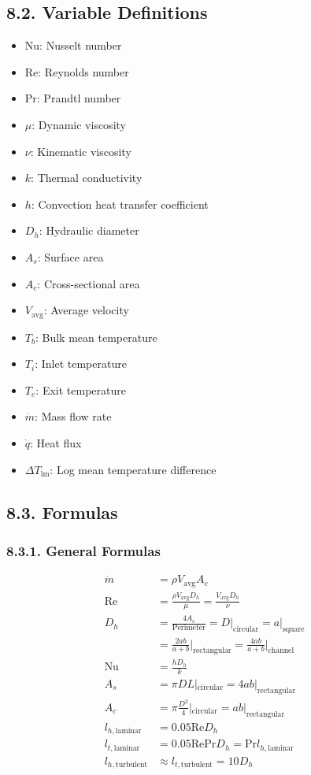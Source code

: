 \begin{multicols*}{2}
\subsection*{8.2. Variable Definitions}
\begin{itemize}
    \item Nu: Nusselt number
    \item Re: Reynolds number
    \item Pr: Prandtl number
    \item $\mu$: Dynamic viscosity
    \item $\nu$: Kinematic viscosity
    \item $k$: Thermal conductivity
    \item $h$: Convection heat transfer coefficient
    \item $D_h$: Hydraulic diameter
    \item $A_s$: Surface area
    \item $A_c$: Cross-sectional area
    \item $V_{\text{avg}}$: Average velocity
    \item $T_b$: Bulk mean temperature
    \item $T_i$: Inlet temperature
    \item $T_e$: Exit temperature
    \item $\dot{m}$: Mass flow rate
    \item $\dot{q}$: Heat flux 
    \item $\Delta T_{\text{lm}}$: Log mean temperature difference   
\end{itemize}

\subsection*{8.3. Formulas}
\subsubsection*{8.3.1. General Formulas}
\begin{align*}
    \dot{m} &= \rho V_{\text{avg}} A_c \\
    \text{Re} &= \frac{\rho V_{\text{avg}} D_h}{\mu}  = \frac{V_{\text{avg}} D_h}{\nu} \\
    D_h &= \frac{4 A_c}{\text{Perimeter}} = D\rvert_{\text{circular}} = a\rvert_{\text{square}}   \\
    &= \frac{2ab}{a + b} \bigg\rvert_{\text{rectangular}} = \frac{4ab}{a+b}\bigg\rvert_{\text{channel}} \\
    \text{Nu} &= \frac{hD_h}{k} \\ 
    A_s &= \pi D L|_{\text{circular}} = 4ab|_{\text{rectangular}} \\
    A_c &= \pi \frac{D^2}{4}|_{\text{circular}} = ab|_{\text{rectangular}} \\
    l_{h, \text{laminar}} &= 0.05 \text{Re} D_h \\
    l_{t, \text{laminar}} &= 0.05 \text{Re} \text{Pr} D_h = \text{Pr} l_{h, \text{laminar}} \\
    l_{h, \text{turbulent}} &\approx l_{t, \text{turbulent}} = 10D_h 
\end{align*}

\end{multicols*}
